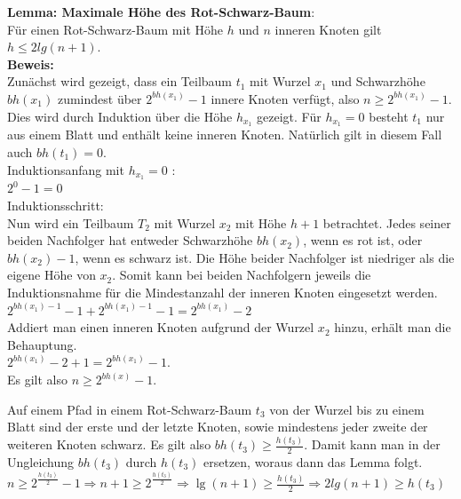 \documentclass[a4paper,12pt]{article}
\begin{document}
\noindent\textbf{Lemma: Maximale Höhe des Rot-Schwarz-Baum}:\\
Für einen Rot-Schwarz-Baum mit Höhe $h$ und $n$ inneren Knoten gilt $h \leq  2 lg(n + 1)$. \\
\noindent\textbf{Beweis:}\\
Zunächst wird gezeigt, dass ein Teilbaum $t_1$ mit Wurzel $x_1$ und Schwarzhöhe $\mathit{bh(x_1)}$ zumindest über $2^{bh(x_1)} - 1$ innere Knoten verfügt, also $n \geq 2^{bh(x_1)} - 1 $. Dies wird durch Induktion über die Höhe $\mathit{h_{x_1}}$ gezeigt. Für $\mathit{h_{x_1}} = 0$ besteht $t_1$ nur aus einem Blatt und enthält keine inneren Knoten. Natürlich gilt in diesem Fall auch $\mathit{bh(t_1) = 0}$.  \\
Induktionsanfang mit $\mathit{h_{x_1} = 0}$ :\\
$2^{0} - 1 = 0$\\
Induktionsschritt:\\
Nun wird ein Teilbaum $T_2$ mit Wurzel $x_2$ mit Höhe $h + 1$ betrachtet. Jedes seiner beiden Nachfolger hat entweder Schwarzhöhe  $\mathit{bh(x_2)}$, wenn es rot ist, oder $\mathit{bh(x_2) - 1}$, wenn es schwarz ist. Die Höhe beider Nachfolger ist niedriger als die eigene Höhe von $x_2$. Somit kann bei beiden Nachfolgern jeweils die Induktionsnahme für die Mindestanzahl der inneren Knoten eingesetzt werden.   \\
$2^{bh(x_1)-1} - 1 + 2^{bh(x_1)-1} - 1  = 2^{bh(x_1)} - 2 $ \\
Addiert man einen inneren Knoten aufgrund der Wurzel $x_2$ hinzu, erhält man die Behauptung.\\
$2^{bh(x_1)} - 2 + 1 = 2^{bh(x_1)} - 1 $.\\
Es gilt also $n \geq 2^{\mathit{bh(x)}} - 1$.

\noindent Auf einem Pfad in einem Rot-Schwarz-Baum $t_3$ von der Wurzel bis zu einem Blatt sind der erste und der letzte Knoten, sowie mindestens jeder zweite der weiteren Knoten schwarz. Es gilt also $\mathit{bh(t_3)} \geq \frac{h(t_3)}{2}$. 
Damit kann man in der Ungleichung $\mathit{bh(t_3)}$ durch $\mathit{h(t_3)}$ ersetzen, woraus dann das Lemma folgt.\\
$n \geq 2^{\frac{\mathit{h(t_3)}}{2}} - 1 \Rightarrow n + 1 \geq 2^{\frac{\mathit{h(t_3)}}{2}} \Rightarrow
\lg(n + 1) \geq \frac{h(t_3)}{2} \Rightarrow 2 lg(n + 1) \geq h(t_3) $ 



\newpage


\end{document}
